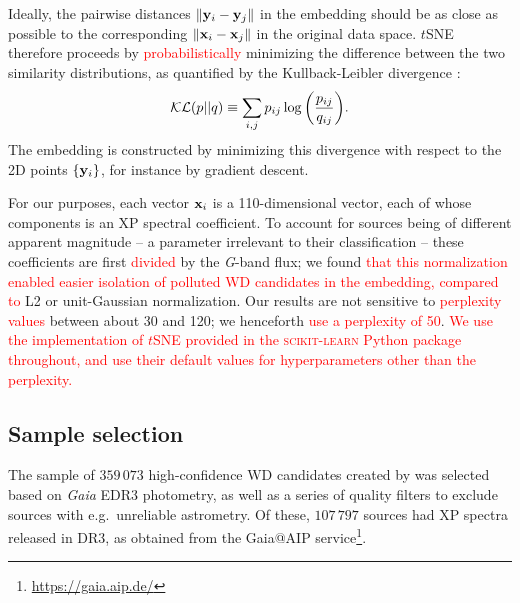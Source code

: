 \documentclass[fleqn,usenatbib]{rasti}
\newcommand\xb{\vb{x}}
\newcommand\yb{\vb{y}}
\newcommand{\red}[1]{\textcolor{red}{#1}}
\begin{document}
Ideally, the pairwise distances $\norm{\yb_i-\yb_j}$ in the embedding should be as close as possible to the corresponding $\norm{\xb_i-\xb_j}$ in the original data space.
$t$SNE therefore proceeds by \red{probabilistically} minimizing the difference between the two similarity distributions, as quantified by the Kullback-Leibler divergence \citep{kullbackleibler}:
\begin{equation}
\mathcal{KL}(p||q)
\equiv \sum_{i, j} p_{ij} \log \qty(
    \frac{p_{ij}}{q_{ij}}
).
\end{equation}
The embedding is constructed by minimizing this divergence with respect to the 2D points $\{\yb_i\}$, for instance by gradient descent.

For our purposes, each vector $\xb_i$ is a 110-dimensional vector, each of whose components is an XP spectral coefficient.
To account for sources being of different apparent magnitude -- a parameter irrelevant to their classification -- these coefficients are first \red{divided} by the \textit{G}-band flux; we found \red{that this normalization enabled easier isolation of polluted WD candidates in the embedding, compared to} L2 or unit-Gaussian normalization.
Our results are not sensitive to \red{perplexity values} between about 30 and 120; we henceforth \red{use a perplexity of 50}.
\red{
We use the implementation of $t$SNE provided in the \textsc{scikit-learn} Python package \citep{sklearn} throughout, and use their default values for hyperparameters other than the perplexity.
}


\subsection{Sample selection}
The sample of $359\,073$ high-confidence WD candidates created by \citet{gentilefusillo21} was selected based on \textit{Gaia} EDR3 photometry, as well as a series of quality filters to exclude sources with e.g.\ unreliable astrometry.
Of these, $107\,797$ sources had XP spectra released in DR3, as obtained from the Gaia@AIP service\footnote{
    \url{https://gaia.aip.de/}
}.
\end{document}
